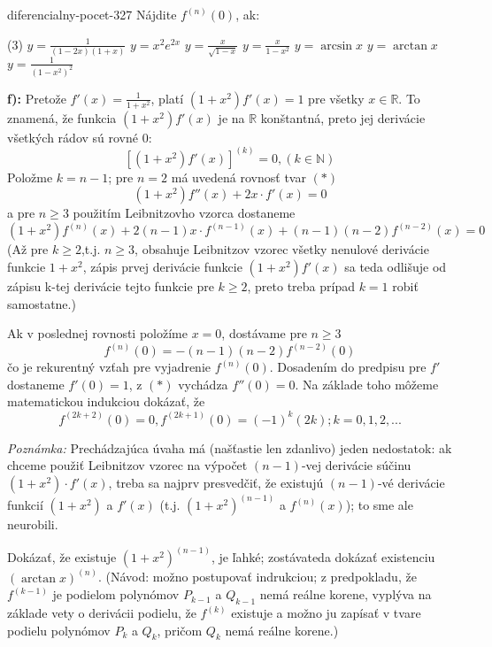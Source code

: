 \begin{defproblem}{diferencialny-pocet-327}
Nájdite $f^{(n)}(0)$, ak:
\begin{tasks}(3)
  \task $y=\frac{1}{(1-2x)(1+x)}$
  \task $y=x^2e^{2x}$
  \task $y=\frac{x}{\sqrt{1-x}}$
  \task $y=\frac{x}{1-x^2}$
  \task $y=\arcsin x$
  \task $y=\arctan x$
  \task $y=\frac{1}{(1-x^2)^2}$
\end{tasks}

\begin{solution}
  \textbf{f):}
  Pretože $f'(x)=\frac{1}{1+x^2}$, platí $(1+x^2)f'(x)=1$ pre všetky $x
  \in\mathbb{R}$. To znamená, že funkcia $(1+x^2)f'(x)$ je na $\mathbb{R}$
  konštantná, preto jej derivácie všetkých rádov sú rovné $0$:
  \[
    [(1+x^2)f'(x)]^{(k)}=0,(k\in\mathbb{N})
  \]
  Položme $k=n-1$; pre $n=2$ má uvedená rovnosť tvar $(*)$
  \[
    (1+x^2)f''(x)+2x\cdot f'(x)=0
  \]
  a pre $n\geq 3$ použitím Leibnitzovho vzorca dostaneme
  \[
    (1+x^2)f^{(n)}(x)+2(n-1)x\cdot f^{(n-1)}(x)+(n-1)(n-2)f^{(n-2)}(x)=0
  \]
  (Až pre $k \geq 2$,t.j. $n\geq 3$, obsahuje Leibnitzov vzorec všetky nenulové
  derivácie funkcie $1+x^2$, zápis prvej derivácie funkcie $(1+x^2)f'(x)$ sa
  teda odlišuje od zápisu k-tej derivácie tejto funkcie pre $k\geq 2$, preto
  treba prípad $k=1$ robiť samostatne.)

  Ak v poslednej rovnosti položíme $x=0$, dostávame pre $n\geq 3$
  \[
    f^{(n)}(0)=-(n-1)(n-2)f^{(n-2)}(0)
  \]
  čo je rekurentný vzťah pre vyjadrenie $f^{(n)}(0)$. Dosadením do predpisu pre
  $f'$ dostaneme $f'(0)=1$, z $(*)$ vychádza $f''(0)=0$. Na základe toho môžeme
  matematickou indukciou dokázať, že
  \[
    f^{(2k+2)}(0)=0,f^{(2k+1)}(0)=(-1)^k(2k) ; k=0,1,2,...
  \]

  \textit{Poznámka:}
  Prechádzajúca úvaha má (našťastie len zdanlivo) jeden nedostatok: ak chceme
  použiť Leibnitzov vzorec na výpočet $(n-1)$-vej derivácie súčinu $(1+x^2)\cdot
  f'(x)$, treba sa najprv presvedčiť, že existujú $(n-1)$-vé derivácie funkcií
  $(1+x^2)$ a $f'(x)$ (t.j. $(1+x^2)^{(n-1)}$ a $f^{(n)}(x)$); to sme ale
  neurobili.

  Dokázať, že existuje $(1+x^2)^{(n-1)}$, je ľahké; zostávateda dokázať
  existenciu $(\arctan x)^{(n)}$. (Návod: možno postupovať indrukciou; z
  predpokladu, že $f^{(k-1)}$ je podielom polynómov $P_{k-1}$ a $Q_{k-1}$ nemá
  reálne korene, vyplýva na základe vety o derivácii podielu, že $f^{(k)}$
  existuje a možno ju zapísať v tvare podielu polynómov $P_k$ a $Q_k$, pričom
  $Q_k$ nemá reálne korene.)
\end{solution}
\end{defproblem}

